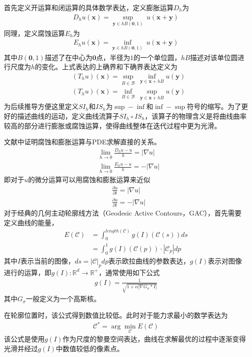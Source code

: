 首先定义开运算和闭运算的具体数学表达，定义膨胀运算$D_h$为
\begin{align}
D_hu(\mathbf{x}) = \sup_{\mathbf{y}\in hB(\mathbf{0},1)}\ u(\mathbf{x}+\mathbf{y})
\end{align}
同理，定义腐蚀运算$E_h$为
\begin{align}
E_hu(\mathbf{x}) = \inf_{\mathbf{y}\in hB(\mathbf{0},1)}\ u(\mathbf{x}+\mathbf{y})
\end{align}
其中$B(\mathbf{0},1)$描述了在中心为$\mathbf{0}$点，半径为$1$的一个单位圆，$hB$描述对该单位圆进行尺度为$h$的变化。上式表达的上确界和下确界表达定义为
\begin{align}
&(T_hu)(\mathbf{x}) = \sup_{B\in\mathcal{B}}\  \inf_{\mathbf{y}\in\mathbf{x}+hB} u(\mathbf{y}) \\
&(T_hu)(\mathbf{x}) = \inf_{B\in\mathcal{B}}\  \sup_{\mathbf{y}\in\mathbf{x}+hB} u(\mathbf{y})
\end{align}
为后续推导方便这里定义$SI_h$和$IS_h$为$\sup-\inf$和$\inf-\sup$符号的缩写。为了更好的描述曲线的运动，定义曲线流算子$SI_h \circ IS_h$，该算子的物理含义是将曲线曲率较高的部分进行膨胀或腐蚀运算，使得曲线整体在迭代过程中更为光滑。

文献\cite{alvarez1993axioms}中证明腐蚀和膨胀运算与PDE求解直接的关系。
\begin{align}
&\lim_{h \rightarrow 0} \frac{D_hu-u}{h} = |\nabla u| \\
&\lim_{h \rightarrow 0} \frac{E_hu-u}{h} = -|\nabla u|
\end{align}
即对于$u$的微分运算可以用腐蚀和膨胀运算来近似
\begin{align}
&\frac{\partial u}{\partial t} = |\nabla u| \\
&\frac{\partial u}{\partial t} = -|\nabla u|
\end{align}
对于经典的几何主动轮廓线方法（Geodesic Active Contours，GAC），首先需要定义曲线的能量，
\begin{align}
E(\mathcal{C}) &=\int_0^{length (\mathcal{C})}g(I)(\mathcal{C}(s))ds \\
&=\int_0^1g(I)(\mathcal{C}(p)) \cdot |\mathcal{C}_p|dp
\end{align}
其中$I$表示当前的图像，$ds = |\mathcal{C}|_pdp$表示欧拉曲线的参数表达，$g(I)$表示对图像进行的运算，即$g(I) : \mathbb{R}^d \rightarrow \mathbb{R}^+$，通常使用如下公式
\begin{align}
g(I) = \frac{1}{\sqrt{1+\alpha|\nabla G_\sigma *I|}}
\end{align}
其中$G_\sigma$一般定义为一个高斯核。

在轮廓位置时，该公式得到数值比较低。此时对于能力求最小的数学表达为
\begin{align}
\mathcal{C}^*=\arg \min_\mathcal{C} E(\mathcal{C})
\end{align}
该公式是使用$g(I)$作为尺度的黎曼空间表达，曲线在求解最优的过程中逐渐变得光滑并经过$g(I)$中数值较低的像素点。

